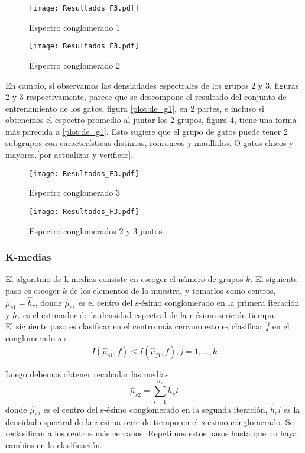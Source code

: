 \documentclass[twocolumn,10pt]{asme2ej}
\begin{document}
\begin{figure}[h]
  \centering
    \texttt{[image: Resultados\_F3.pdf]}
  \caption{Espectro conglomerado 1}
  \label{plot:espec_11}
\end{figure}
\begin{figure}[h]
  \centering
    \texttt{[image: Resultados\_F3.pdf]}
  \caption{Espectro conglomerado 2}
  \label{plot:espec_12}
\end{figure}
En cambio, si observamos las densiadades espectrales de los grupos 2 y 3, figuras \ref{plot:espec_12} y \ref{plot:espec_13} respectivamente, parece que se descompone el resultado del conjunto de entrenamiento de los gatos, figura \ref{plot:de_g1}, en 2 partes, e incluso si obtenemos el espectro promedio al juntar los 2 grupos, figura \ref{plot:espec_123}, tiene una forma m\'as parecida a \ref{plot:de_g1}. Esto sugiere que el grupo de gatos puede tener 2 subgrupos con caracter\'isticas distintas, ronroneos y maullidos. O gatos chicos y mayores.[por actualizar y verificar].
\begin{figure}[h]
  \centering
    \texttt{[image: Resultados\_F3.pdf]}
  \caption{Espectro conglomerado 3}
  \label{plot:espec_13}
\end{figure}
\begin{figure}[h]
  \centering
    \texttt{[image: Resultados\_F3.pdf]}
  \caption{Espectro conglomerados 2 y 3 juntos}
  \label{plot:espec_123}
\end{figure}
\subsubsection*{K-medias} %
\label{ssub:k_medias}
El algoritmo de k-medias consiste en escoger el n\'umero de grupos $k$. El siguiente paso es escoger $k$ de los elementos de la muestra, y tomarlos como centros, $\hat{\mu}_{s1}=\hat{h}_r$, donde $\hat{\mu}_{s1}$ es el centro del s-\'esimo conglomerado en la primera iteraci\'on y $\hat{h}_r$ es el estimador de la densidad espectral de la r-\'esimo serie de tiempo.\\

El siguiente paso es clasificar en el centro m\'as cercano esto es clasificar $\hat{f}$  en el conglomerado $s$ si 
$$I(\hat{\mu}_{s1}, f)\leq I(\hat{\mu}_{j1}, f), j=1,\dots,k$$

Luego debemos obtener recalcular las medias 
$$\hat{\mu}_{s2}=\sum_{i=1}^{n_s}\hat{h}_si$$
donde $\hat{\mu}_{s2}$ es el centro del s-\'esimo conglomerado en la segunda iteraci\'on, $\hat{h}_si$ es la densidad espectral de la $i$-\'esima serie de tiempo en el $s$-\'esimo conglomerado. Se reclasifican a los centros m\'as cercanos. Repetimos estos pasos hasta que no haya cambios en la clasificaci\'on.\\
\end{document}
